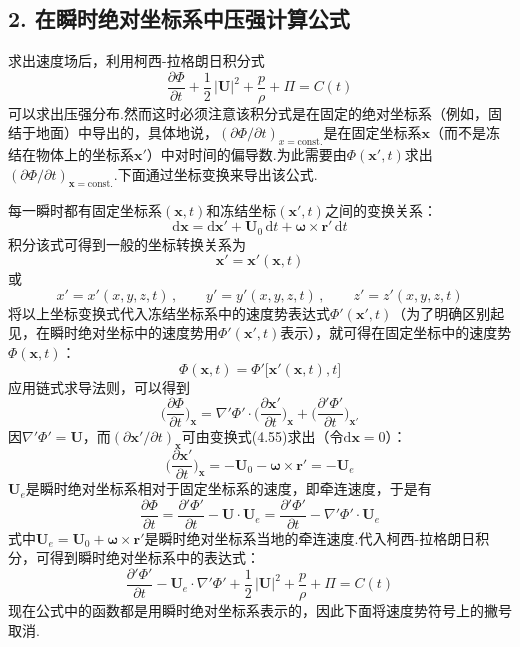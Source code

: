 \subsection*{2. 在瞬时绝对坐标系中压强计算公式}

求出速度场后，利用柯西-拉格朗日积分式
\[
\frac{\partial\Phi}{\partial t}+\frac{1}{2}\,|\boldsymbol{U}|^{2}+\frac{p}{\rho}+\Pi=C(t)
\]
可以求出压强分布.然而这时必须注意该积分式是在固定的绝对坐标系（例如，固结于地面）中导出的，具体地说，$(\partial\Phi/\partial t)_{x=\mathrm{const.}}$是在固定坐标系$\boldsymbol{x}$（而不是冻结在物体上的坐标系$\boldsymbol{x}'$）中对时间的偏导数.为此需要由$\Phi(\boldsymbol{x}',t)$求出$(\partial\Phi/\partial t)_{\boldsymbol{x}=\mathrm{const.}}$.下面通过坐标变换来导出该公式.

每一瞬时都有固定坐标系$(\boldsymbol{x},t)$和冻结坐标$(\boldsymbol{x}',t)$之间的变换关系：
\begin{equation*}
\mathrm{d}\boldsymbol{x}=\mathrm{d}\boldsymbol{x}'+\boldsymbol{U}_0\,\mathrm{d}t+\boldsymbol{\omega}\times\boldsymbol{r}'\,\mathrm{d}t
\tag{4.55}
\end{equation*}
积分该式可得到一般的坐标转换关系为
\[
\boldsymbol{x}'=\boldsymbol{x}'(\boldsymbol{x},t)
\]
或
\[
x'=x'(x,y,z,t)\,,\qquad y'=y'(x,y,z,t)\,,\qquad z'=z'(x,y,z,t)
\]
将以上坐标变换式代入冻结坐标系中的速度势表达式$\Phi'(\boldsymbol{x}',t)$（为了明确区别起见，在瞬时绝对坐标中的速度势用$\Phi'(\boldsymbol{x}',t)$表示），就可得在固定坐标中的速度势$\Phi(\boldsymbol{x},t)$：
\[
\Phi(\boldsymbol{x},t)=\Phi'\big[\boldsymbol{x}'(\boldsymbol{x},t),t\big]
\]
应用链式求导法则，可以得到
\[
\Big(\frac{\partial\Phi}{\partial t}\Big)_{\boldsymbol{x}}=\nabla'\Phi'\cdot\Big(\frac{\partial\boldsymbol{x}'}{\partial t}\Big)_{\boldsymbol{x}}+\Big(\frac{\partial'\Phi'}{\partial t}\Big)_{\boldsymbol{x}'}
\]
因$\nabla'\Phi'=\boldsymbol{U}$，而$(\partial\boldsymbol{x}'/\partial t)_{\boldsymbol{x}}$可由变换式(4.55)求出（令$\mathrm{d}\boldsymbol{x}=0$）：
\[
\Big(\frac{\partial\boldsymbol{x}'}{\partial t}\Big)_{\boldsymbol{x}}=-\boldsymbol{U}_0-\boldsymbol{\omega}\times\boldsymbol{r}'=-\boldsymbol{U}_e
\]
$\boldsymbol{U}_e$是瞬时绝对坐标系相对于固定坐标系的速度，即牵连速度，于是有
\begin{equation*}
\frac{\partial\Phi}{\partial t}=\frac{\partial'\Phi'}{\partial t}-\boldsymbol{U}\cdot\boldsymbol{U}_e=\frac{\partial'\Phi'}{\partial t}-\nabla'\Phi'\cdot\boldsymbol{U}_e
\tag{4.56}
\end{equation*}
式中$\boldsymbol{U}_e=\boldsymbol{U}_0+\boldsymbol{\omega}\times\boldsymbol{r}'$是瞬时绝对坐标系当地的牵连速度.代入柯西-拉格朗日积分，可得到瞬时绝对坐标系中的表达式：
\[
\frac{\partial'\Phi'}{\partial t}-\boldsymbol{U}_e\cdot\nabla'\Phi'+\frac{1}{2}\,|\boldsymbol{U}|^{2}+\frac{p}{\rho}+\Pi=C(t)
\]
现在公式中的函数都是用瞬时绝对坐标系表示的，因此下面将速度势符号上的撇号取消.

